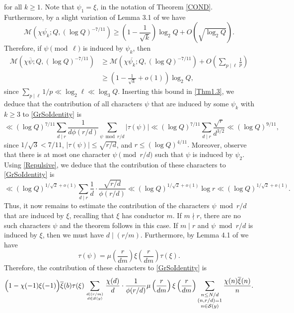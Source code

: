 \documentclass[12pt]{amsart}
\theoremstyle{definition}
\numberwithin{equation}{section}
\newcommand{\mc}{\mathcal}
\renewcommand{\bar}{\overline}
\begin{document}
for all $k \geq 1$. Note that $\psi_1=\xi$, in the notation of Theorem \ref{COND}. Furthermore, by a slight variation of Lemma 3.1 of \cite{BGS} we have  
$$
 \mc{M}\left(\chi\bar{\psi_k};Q, (\log Q)^{-7/11}\right) \geq 
\left(1-\frac{1}{\sqrt{k}}\right)\log_2 Q+O\left(\sqrt{\log_2 Q}\right).
$$
Therefore, if $\psi \pmod \ell$ is induced by $\psi_{k}$, then
\begin{equation}\label{Repulsive}
\begin{aligned}
\mc{M}\left(\chi\bar{\psi};Q, (\log Q)^{-7/11}\right) &\geq \mc{M}\left(\chi\bar{\psi_k};Q, (\log Q)^{-7/11}\right) +O\left(\sum_{p \mid \ell} \frac{1}{p}\right)\\
 &\geq 
\left(1-\frac{1}{\sqrt{k}}+o(1)\right)\log_2 Q,
\end{aligned}
\end{equation}
since $\sum_{p\mid \ell}1/p\ll \log_2 \ell\ll \log_3 Q$. 
Inserting this bound in \eqref{Thm1.3}, we deduce that the contribution of all characters $\psi$ that are induced by some $\psi_k$ with $k\geq 3$ to \eqref{GrSoIdentity} is
$$
\ll (\log Q)^{7/11}\sum_{d\mid r} \frac{1}{d\phi(r/d)} \sum_{\psi \bmod r/d}|\tau(\psi)|\ll  (\log Q)^{7/11}\sum_{d\mid r} \frac{\sqrt{r}}{d^{3/2}}\ll (\log Q)^{9/11},
$$
since $1/\sqrt{3}<7/11$, $|\tau(\psi)|\leq \sqrt{r/d}$, and $r\leq (\log Q)^{4/11}.$ Moreover, 
observe that there is at most one character $\psi \pmod{r/d}$ such that $\psi$ is induced by $\psi_2$. Using \eqref{Repulsive}, we deduce that the contribution of these characters to  \eqref{GrSoIdentity} is
$$ \ll (\log Q)^{1/\sqrt{2}+o(1)}\sum_{d\mid r} \frac{1}{d}\cdot\frac{\sqrt{r/d}}{\phi(r/d)} \ll (\log Q)^{1/\sqrt{2}+o(1)}\log r \ll(\log Q)^{1/\sqrt{2}+o(1)}. $$
Thus, it now remains to estimate the contribution of the characters $\psi\bmod r/d$ that are induced by $\xi$, recalling that $\xi$ has conductor $m$. If $m\nmid r$, there are no such characters $\psi$ and the theorem follows in this case. If $m\mid r$ and $\psi\bmod r/d$ is induced by $\xi$, then we must have $d \mid (r/m)$. Furthermore, by Lemma 4.1 of \cite{GrSo2} we have 
$$\tau(\psi)= \mu\left(\frac{r}{dm}\right)\xi\left(\frac{r}{dm}\right)\tau(\xi).$$
Therefore, the contribution of these characters to \eqref{GrSoIdentity} is
\begin{equation}\label{INDUCED}
\Big(1-\chi(-1)\xi(-1)\Big)\bar{\xi}(b)\tau(\xi)\sum_{d\mid (r/m) \atop d \in \mc{S}(y)} \frac{\chi(d)}{d}\cdot \frac{1}{\phi(r/d)}  \mu\left(\frac{r}{dm}\right)\xi\left(\frac{r}{dm}\right)
\sum_{\substack{n \leq N/d\\ (n, r/d)=1\\ n \in \mc{S}(y)}} \frac{\chi(n)\bar{\xi}(n)}{n}.
\end{equation}
\end{document}
